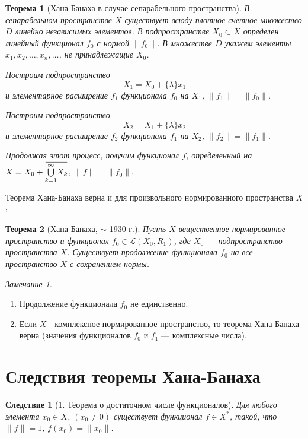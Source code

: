 \documentclass[12pt,a4paper,titlepage,oneside]{book}
\newcommand{\overbar}[1]{\mkern 1.5mu\overline{\mkern-1.5mu#1\mkern-1.5mu}\mkern 1.5mu}
\theoremstyle{definition}
\theoremstyle{plain}
\newtheorem*{theorem}{Теорема}
\theoremstyle{break}
\theoremstyle{remark}
\newtheorem*{remark}{Замечание}
\theoremstyle{remark}
\theoremstyle{remark}
\theoremstyle{remark}
\theoremstyle{plain}
\theoremstyle{plain}
\newtheorem*{corollary}{Следствие}
\begin{document}
\begin{theorem}[Хана-Банаха в случае сепарабельного пространства]
В сепарабельном пространстве $X$ существует всюду плотное счетное множество $D$ линейно независимых элементов. В подпространстве $X_0 \subset X$ определен линейный функционал $f_0$ с нормой $\lVert f_0 \rVert$. В множестве $D$ укажем элементы $x_1, x_2, \ldots, x_n,\ldots$, не принадлежащие $X_0$.

Построим подпространство
$$X_1=X_0+\{ \lambda\}x_1 $$
и элементарное расширение $f_1$ функционала $f_0$ на $X_1$, $\lVert f_1 \rVert= \lVert f_0 \rVert$.

Построим подпространство
$$X_2=X_1+\{ \lambda\}x_2 $$
и элементарное расширение $f_2$ функционала $f_1$ на $X_2$, $\lVert f_2 \rVert= \lVert f_1 \rVert$.

Продолжая этот процесс, получим функционал $f$, определенный на $X=X_0+\overbar{\overset{\infty}{\underset{k=1}{\bigcup}}X_k}$, $\lVert f \rVert= \lVert f_0 \rVert.$
\end{theorem}
Теорема Хана-Банаха верна и для произвольного нормированного пространства $X$: 
\begin{theorem}[Хана-Банаха, $\sim$ 1930 г.]
Пусть $X$ вещественное нормированное пространство и функционал $f_0 \in \mathcal{L}(X_0, R_1)$, где $X_0$ --- подпространство пространства $X$. Существует продолжение функционала $f_0$ на все пространство $X$ с сохранением нормы. 
\end{theorem}
\begin{remark}
\hfill \newline
\begin{enumerate}
\item Продолжение функционала $f_0$ не единственно.
\item Если $X$ - комплексное нормированное пространство, то теорема Хана-Банаха верна (значения функционалов $f_0$ и $f_1$ --- комплексные числа).
\end{enumerate}
\end{remark}

\section{Следствия теоремы Хана-Банаха}

\begin{corollary}[1. Теорема о достаточном числе функционалов]
Для любого элемента $x_0 \in X$, $(x_0 \ne0)$ существует функционал $f \in X^*$, такой, что $\lVert f \rVert=1$, $f(x_0)=\lVert x_0\rVert$.
\end{corollary}
\end{document}
